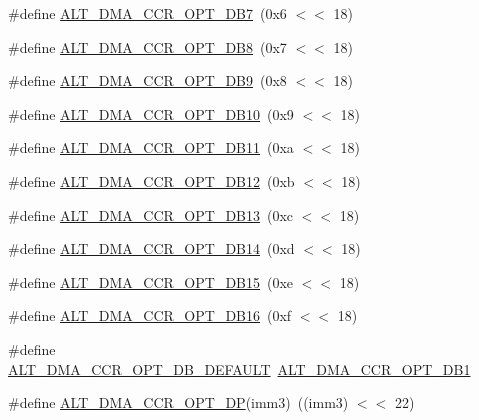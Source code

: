 \begin{DoxyCompactItemize}
\item 
\#define \mbox{\hyperlink{group__DMA__CCR_gadbf6eb9363bfc3b56c82c7ddff956fc6}{A\+L\+T\+\_\+\+D\+M\+A\+\_\+\+C\+C\+R\+\_\+\+O\+P\+T\+\_\+\+D\+B7}}~(0x6 $<$$<$ 18)
\item 
\#define \mbox{\hyperlink{group__DMA__CCR_ga7ab9394622a5441165894c5329692f61}{A\+L\+T\+\_\+\+D\+M\+A\+\_\+\+C\+C\+R\+\_\+\+O\+P\+T\+\_\+\+D\+B8}}~(0x7 $<$$<$ 18)
\item 
\#define \mbox{\hyperlink{group__DMA__CCR_gab7015174029c094247639918b37b32c6}{A\+L\+T\+\_\+\+D\+M\+A\+\_\+\+C\+C\+R\+\_\+\+O\+P\+T\+\_\+\+D\+B9}}~(0x8 $<$$<$ 18)
\item 
\#define \mbox{\hyperlink{group__DMA__CCR_ga63c53c74067c014eecd79ac87a94a83b}{A\+L\+T\+\_\+\+D\+M\+A\+\_\+\+C\+C\+R\+\_\+\+O\+P\+T\+\_\+\+D\+B10}}~(0x9 $<$$<$ 18)
\item 
\#define \mbox{\hyperlink{group__DMA__CCR_gad2656f6c88e1241f56759413870de9b1}{A\+L\+T\+\_\+\+D\+M\+A\+\_\+\+C\+C\+R\+\_\+\+O\+P\+T\+\_\+\+D\+B11}}~(0xa $<$$<$ 18)
\item 
\#define \mbox{\hyperlink{group__DMA__CCR_ga162fc2e7957ac5dee1eac257b7eb0e0a}{A\+L\+T\+\_\+\+D\+M\+A\+\_\+\+C\+C\+R\+\_\+\+O\+P\+T\+\_\+\+D\+B12}}~(0xb $<$$<$ 18)
\item 
\#define \mbox{\hyperlink{group__DMA__CCR_ga156e0911159a50c35a42277715f5fba8}{A\+L\+T\+\_\+\+D\+M\+A\+\_\+\+C\+C\+R\+\_\+\+O\+P\+T\+\_\+\+D\+B13}}~(0xc $<$$<$ 18)
\item 
\#define \mbox{\hyperlink{group__DMA__CCR_ga1d3c9025f64c0cb28608b3fe23303923}{A\+L\+T\+\_\+\+D\+M\+A\+\_\+\+C\+C\+R\+\_\+\+O\+P\+T\+\_\+\+D\+B14}}~(0xd $<$$<$ 18)
\item 
\#define \mbox{\hyperlink{group__DMA__CCR_gacfc508f4de22b04ec79a9c155c073221}{A\+L\+T\+\_\+\+D\+M\+A\+\_\+\+C\+C\+R\+\_\+\+O\+P\+T\+\_\+\+D\+B15}}~(0xe $<$$<$ 18)
\item 
\#define \mbox{\hyperlink{group__DMA__CCR_gad67ce255e6d66c745f086d8d78c23985}{A\+L\+T\+\_\+\+D\+M\+A\+\_\+\+C\+C\+R\+\_\+\+O\+P\+T\+\_\+\+D\+B16}}~(0xf $<$$<$ 18)
\item 
\#define \mbox{\hyperlink{group__DMA__CCR_ga50e0ce7bb909a2524522a589238c8a76}{A\+L\+T\+\_\+\+D\+M\+A\+\_\+\+C\+C\+R\+\_\+\+O\+P\+T\+\_\+\+D\+B\+\_\+\+D\+E\+F\+A\+U\+LT}}~\mbox{\hyperlink{group__DMA__CCR_gaece992399339790059769e6b3e41ecfd}{A\+L\+T\+\_\+\+D\+M\+A\+\_\+\+C\+C\+R\+\_\+\+O\+P\+T\+\_\+\+D\+B1}}
\item 
\#define \mbox{\hyperlink{group__DMA__CCR_ga3d5908c2af7a749d5514ce81e5b1df0f}{A\+L\+T\+\_\+\+D\+M\+A\+\_\+\+C\+C\+R\+\_\+\+O\+P\+T\+\_\+\+DP}}(imm3)~((imm3) $<$$<$ 22)
$$
\end{DoxyCompactItemize}
